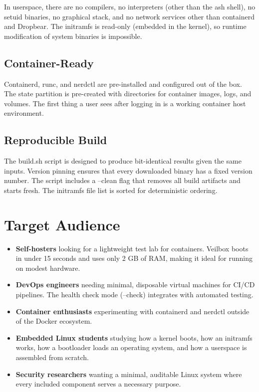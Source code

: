In userspace, there are no compilers, no interpreters (other than the ash
shell), no setuid binaries, no graphical stack, and no network services
other than containerd and Dropbear. The initramfs is read-only (embedded
in the kernel), so runtime modification of system binaries is impossible.

\subsection{Container-Ready}

Containerd, runc, and nerdctl are pre-installed and configured out of the
box. The state partition is pre-created with directories for container
images, logs, and volumes. The first thing a user sees after logging in is
a working container host environment.

\subsection{Reproducible Build}

The build.sh script is designed to produce bit-identical results given the
same inputs. Version pinning ensures that every downloaded binary has a
fixed version number. The script includes a --clean flag that removes all
build artifacts and starts fresh. The initramfs file list is sorted for
deterministic ordering.

\section{Target Audience}

\begin{itemize}[nosep]
  \item \textbf{Self-hosters} looking for a lightweight test lab for
        containers. Veilbox boots in under 15 seconds and uses only
        2 GB of RAM, making it ideal for running on modest hardware.
  \item \textbf{DevOps engineers} needing minimal, disposable virtual
        machines for CI/CD pipelines. The health check mode (--check)
        integrates with automated testing.
  \item \textbf{Container enthusiasts} experimenting with containerd and
        nerdctl outside of the Docker ecosystem.
  \item \textbf{Embedded Linux students} studying how a kernel boots, how
        an initramfs works, how a bootloader loads an operating system,
        and how a userspace is assembled from scratch.
  \item \textbf{Security researchers} wanting a minimal, auditable Linux
        system where every included component serves a necessary purpose.
\end{itemize}

